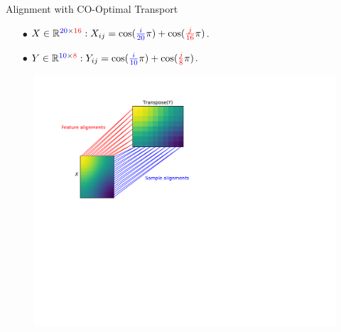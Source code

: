 \documentclass{beamer}
\newcommand{\bbR}{\mathbb R}
\begin{document}
\begin{frame}{Alignment with CO-Optimal Transport}
  \scriptsize
  \vspace*{0.5cm}
  \begin{itemize}
    \setlength\itemsep{0.2cm}
    \item[$\bullet$] $X \in \bbR^{{\color{blue}{20}} \times {\color{red}{16}}}: X_{ij} = \cos({\color{blue}{\frac{i}{20}}} \pi) + \cos({\color{red}{\frac{j}{16}}} \pi)$.
    \item[$\bullet$] $Y \in \bbR^{{\color{blue}{10}} \times {\color{red}{8}}}: Y_{ij} = \cos({\color{blue}{\frac{i}{10}}} \pi) + \cos({\color{red}{\frac{j}{8}}} \pi)$.
  \end{itemize}
  \vspace*{-0.2cm}
  \begin{figure}
    \centering
    \includegraphics[width=1.4\linewidth, keepaspectratio=true]{OT_new/UCOOT_plot_intro.pdf}
  \end{figure}
\end{frame}
\end{document}
